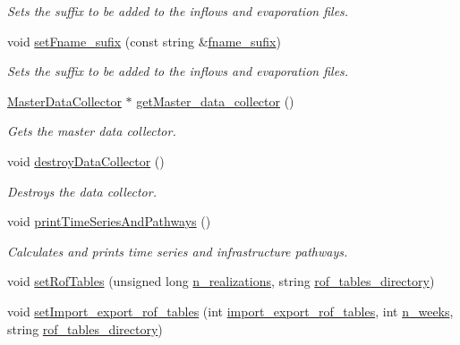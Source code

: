 \begin{DoxyCompactItemize}
\begin{DoxyCompactList}\small\item\em Sets the suffix to be added to the inflows and evaporation files. \end{DoxyCompactList}\item 
void \mbox{\hyperlink{classProblem_abc968bcab1302a525cfa5a7f570fc326_abc968bcab1302a525cfa5a7f570fc326}{set\+Fname\+\_\+sufix}} (const string \&\mbox{\hyperlink{classProblem_a59444139a907aaf4c6159caed46c8118_a59444139a907aaf4c6159caed46c8118}{fname\+\_\+sufix}})
\begin{DoxyCompactList}\small\item\em Sets the suffix to be added to the inflows and evaporation files. \end{DoxyCompactList}\item 
\mbox{\hyperlink{classMasterDataCollector}{Master\+Data\+Collector}} $\ast$ \mbox{\hyperlink{classProblem_a9bb7f0f4da14050f4a351e5ddb97c380_a9bb7f0f4da14050f4a351e5ddb97c380}{get\+Master\+\_\+data\+\_\+collector}} ()
\begin{DoxyCompactList}\small\item\em Gets the master data collector. \end{DoxyCompactList}\item 
void \mbox{\hyperlink{classProblem_a9ab819e9fe003d4bdb05d6f2ccc320b3_a9ab819e9fe003d4bdb05d6f2ccc320b3}{destroy\+Data\+Collector}} ()
\begin{DoxyCompactList}\small\item\em Destroys the data collector. \end{DoxyCompactList}\item 
void \mbox{\hyperlink{classProblem_a2458fd2abb3ffaacccf4191a737c9383_a2458fd2abb3ffaacccf4191a737c9383}{print\+Time\+Series\+And\+Pathways}} ()
\begin{DoxyCompactList}\small\item\em Calculates and prints time series and infrastructure pathways. \end{DoxyCompactList}\item 
void \mbox{\hyperlink{classProblem_aa9debdf28260fd9054f7d6d2ee516f94_aa9debdf28260fd9054f7d6d2ee516f94}{set\+Rof\+Tables}} (unsigned long \mbox{\hyperlink{classProblem_a270a5672643bfe09e52e0f24e1884136_a270a5672643bfe09e52e0f24e1884136}{n\+\_\+realizations}}, string \mbox{\hyperlink{classProblem_abc641b49a4defb0dbabafbf3f9dbca6e_abc641b49a4defb0dbabafbf3f9dbca6e}{rof\+\_\+tables\+\_\+directory}})
\item 
void \mbox{\hyperlink{classProblem_a4af40eab4f22f8754066410f7088b9db_a4af40eab4f22f8754066410f7088b9db}{set\+Import\+\_\+export\+\_\+rof\+\_\+tables}} (int \mbox{\hyperlink{classProblem_ac5a286f34cec786a0ad56c77783a201c_ac5a286f34cec786a0ad56c77783a201c}{import\+\_\+export\+\_\+rof\+\_\+tables}}, int \mbox{\hyperlink{classProblem_ac7513bb0ecdfa4bbb7d2ada3595d71ec_ac7513bb0ecdfa4bbb7d2ada3595d71ec}{n\+\_\+weeks}}, string \mbox{\hyperlink{classProblem_abc641b49a4defb0dbabafbf3f9dbca6e_abc641b49a4defb0dbabafbf3f9dbca6e}{rof\+\_\+tables\+\_\+directory}})

\end{DoxyCompactItemize}
